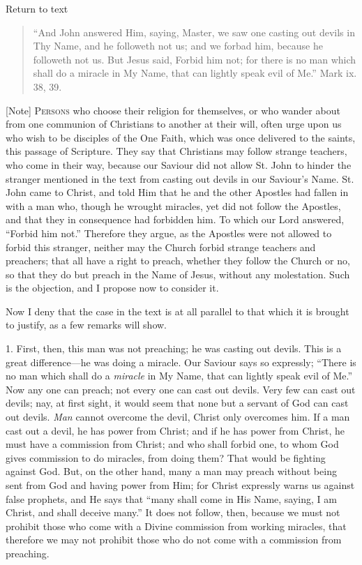 Return to text


\begin{quote}

``And John answered Him, saying, Master, we saw one casting
out devils in Thy Name, and he followeth not us; and we forbad him,
because he followeth not us. But Jesus said, Forbid him not; for
there is no man which shall do a miracle in My Name, that can
lightly speak evil of Me.'' Mark ix. 38, 39.

\end{quote}

[Note] P\textsc{ersons} who choose their
religion for themselves, or who wander about from one communion of
Christians to another at their will, often urge upon us who wish to be
disciples of the One Faith, which was once delivered to the saints,
this passage of Scripture. They say that Christians may follow strange
teachers, who come in their way, because our Saviour did not allow St.
John to hinder the stranger mentioned in the text from casting out
devils in our Saviour's Name. St. John came to Christ, and told Him
that he and the other Apostles had fallen in with a man who, though he
wrought miracles, yet did not follow the Apostles, and that they in
consequence had forbidden him. To which our Lord answered,
``Forbid him not.'' Therefore they argue, as the Apostles were
not allowed to forbid this stranger, neither may the Church forbid
strange teachers and preachers; that all have a right to preach,
whether they follow the Church or no, so that they do but preach in
the Name of Jesus, without any molestation. Such is the objection, and
I propose now to consider it.

Now I deny that the case in the text is at all parallel to that
which it is brought to justify, as a few remarks will show.

1. First, then, this man was not preaching; he was casting out
devils. This is a great difference—he was doing a miracle. Our
Saviour says so expressly; ``There is no man which shall do a \emph{miracle}
in My Name, that can lightly speak evil of Me.'' Now any one can
preach; not every one can cast out devils. Very few can cast out
devils; nay, at first sight, it would seem that none but a servant of
God can cast out devils. \emph{Man} cannot overcome the devil, Christ
only overcomes him. If a man cast out a devil, he has power from
Christ; and if he has power from Christ, he must have a commission
from Christ; and who shall forbid one, to whom God gives commission to
do miracles, from doing them? That would be fighting against God. But,
on the other hand, many a man may preach without being sent from God
and having power from Him; for Christ expressly warns us against false
prophets, and He says that ``many shall come in His Name, saying,
I am Christ, and shall deceive many.'' It does not follow, then,
because we must not prohibit those who come with a Divine commission
from working miracles, that therefore we may not prohibit those who do
not come with a commission from preaching.


